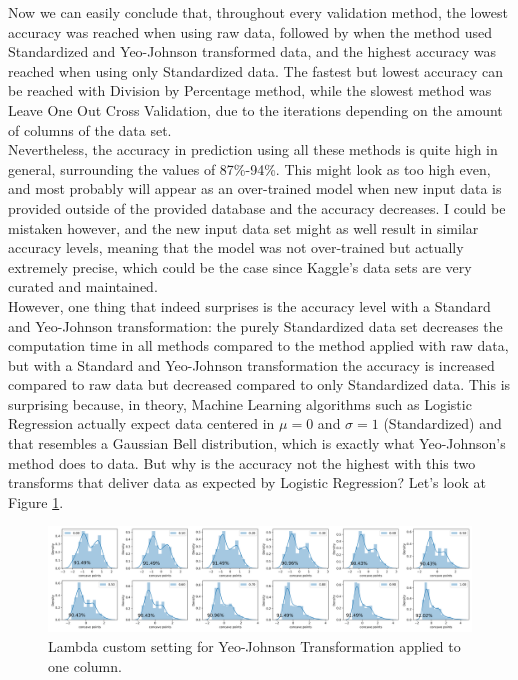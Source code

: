 \documentclass[11pt]{article}
\begin{document}
Now we can easily conclude that, throughout every validation method, the lowest accuracy was reached when using raw data, followed by when the method used Standardized and Yeo-Johnson transformed data, and the highest accuracy was reached when using only Standardized data. The fastest but lowest accuracy can be reached with Division by Percentage method, while the slowest method was Leave One Out Cross Validation, due to the iterations depending on the amount of columns of the data set.
\\

Nevertheless, the accuracy in prediction using all these methods is quite high in general, surrounding the values of 87\%-94\%. This might look as too high even, and most probably will appear as an over-trained model when new input data is provided outside of the provided database and the accuracy decreases. I could be mistaken however, and the new input data set might as well result in similar accuracy levels, meaning that the model was not over-trained but actually extremely precise, which could be the case since Kaggle's data sets are very curated and maintained.
\\

However, one thing that indeed surprises is the accuracy level with a Standard and Yeo-Johnson transformation: the purely Standardized data set decreases the computation time in all methods compared to the method applied with raw data, but with a Standard and Yeo-Johnson transformation the accuracy is increased compared to raw data but decreased compared to only Standardized data. This is surprising because, in theory, Machine Learning algorithms such as Logistic Regression actually expect data centered in $\mu = 0$ and $\sigma = 1$ (Standardized) and that resembles a Gaussian Bell distribution, which is exactly what Yeo-Johnson's method does to data. But why is the accuracy not the highest with this two transforms that deliver data as expected by Logistic Regression? Let's look at Figure \ref{fig:lambdas}.

\begin{figure}[!ht]
\centering
    \includegraphics[width=7in]{lambdas.png}
    \caption{Lambda custom setting for Yeo-Johnson Transformation applied to one column.}
    \label{fig:lambdas}
\end{figure}
\end{document}
